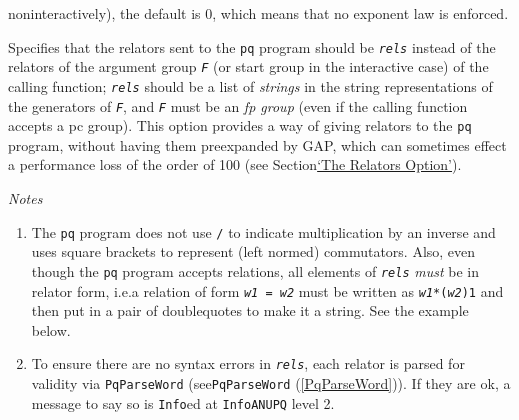 \documentclass[a4paper,11pt]{report}
\begin{document}
{{\begin{description}
non\texttt{}interactively), the default is 0, which means that no
exponent law is enforced. 
\item[{\texttt{Relators := \mbox{\texttt{\mdseries\slshape rels}}} \label{option Relators}\index{option Relators}}]  Specifies that the relators sent to the \texttt{pq} program should be \mbox{\texttt{\mdseries\slshape rels}} instead of the relators of the argument group \mbox{\texttt{\mdseries\slshape F}} (or start group in the interactive case) of the calling function; \mbox{\texttt{\mdseries\slshape rels}} should be a list of \emph{strings} in the string representations of the generators of \mbox{\texttt{\mdseries\slshape F}}, and \mbox{\texttt{\mdseries\slshape F}} must be an \emph{fp group} (even if the calling function accepts a pc group). This option provides a way
of giving relators to the \texttt{pq} program, without having them pre\texttt{}expanded by \textsf{GAP}, which can sometimes effect a performance loss of the order of 100 (see
Section{\nobreakspace}\hyperref[The Relators Option]{`The Relators Option'}). 

 \emph{Notes} 
\begin{enumerate}
\item  The \texttt{pq} program does not use \texttt{/} to indicate multiplication by an inverse and uses square brackets to represent
(left normed) commutators. Also, even though the \texttt{pq} program accepts relations, all elements of \mbox{\texttt{\mdseries\slshape rels}} \emph{must} be in relator form, i.e.{\nobreakspace}a relation of form \texttt{\mbox{\texttt{\mdseries\slshape w1}} = \mbox{\texttt{\mdseries\slshape w2}}} must be written as \texttt{\mbox{\texttt{\mdseries\slshape w1}}*(\mbox{\texttt{\mdseries\slshape w2}})\texttt{}\texttt{}1} and then put in a pair of double\texttt{}quotes to make it a
string. See the example below. 
\item  To ensure there are no syntax errors in \mbox{\texttt{\mdseries\slshape rels}}, each relator is parsed for validity via \texttt{PqParseWord} (see{\nobreakspace}\texttt{PqParseWord} (\ref{PqParseWord})). If they are ok, a message to say so is \texttt{Info}\texttt{}ed at \texttt{InfoANUPQ} level 2. 
\end{enumerate}
 

\end{description}}}
\end{document}
